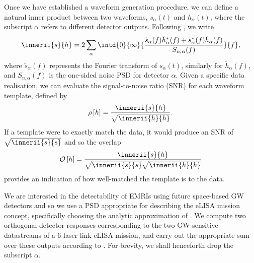 Once we have established a waveform generation procedure, we can define a natural inner product between two waveforms, $s_\alpha(t)$ and $h_\alpha(t)$, where the subscript $\alpha$ refers to different detector outputs. Following , we write
\begin{equation}
\label{eq:effres-innerprod}
\innerii{s}{h} = 2 \sum_\alpha \intd{0}{\infty}{\frac{\tilde{s}_\alpha(f)\tilde{h}_\alpha^*(f)+\tilde{s}_\alpha^*(f)\tilde{h}_\alpha(f)}{S_{n,\alpha}(f)}}{f},
\end{equation}
where $\tilde{s}_\alpha(f)$ represents the Fourier transform of $s_\alpha(t)$, similarly for $\tilde{h}_\alpha(f)$, and $S_{n,\alpha}(f)$ is the one-sided noise PSD for detector $\alpha$. Given a specific data realisation, we can evaluate the signal-to-noise ratio (SNR) for each waveform template, defined by
\begin{equation}
\rho\left[h\right] = \frac{\innerii{s}{h}}{\sqrt{\innerii{h}{h}}}.
\end{equation}
If a template were to exactly match the data, it would produce an SNR of $\sqrt{\innerii{s}{s}}$ and so the overlap
\begin{equation}
\label{eq:effres-overlap}
\mathcal{O}\left[h\right] = \frac{\innerii{s}{h}}{\sqrt{\innerii{s}{s}}\sqrt{\innerii{h}{h}}}
\end{equation}
provides an indication of how well-matched the template is to the data. 

We are interested in the detectability of EMRIs using future space-based GW detectors and so we use a PSD appropriate for describing the eLISA mission concept, specifically choosing the analytic approximation of \citet{amaro-seoane_low-frequency_2012}. We compute two orthogonal detector responses corresponding to the two GW-sensitive datastreams of a 6 laser link eLISA mission, and carry out the appropriate sum over these outputs according to . For brevity, we shall henceforth drop the subscript $\alpha$.

